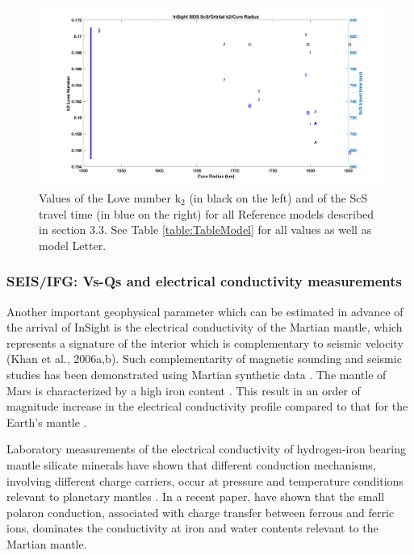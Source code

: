 \begin{figure}[h!]
\begin{center}
\includegraphics[width=1\textwidth]
{figures/FigureScS.png}
\caption{Values of the Love number k$_2$ (in black on the left) and of the ScS travel time (in blue on the right) for all Reference models described in section 3.3. See Table \ref{table:TableModel} for all values as well as model Letter.}
\label{fig:FigureScS.png} 
\end{center}
\end{figure}

\subsubsection{SEIS/IFG: Vs-Qs and electrical conductivity measurements}

Another important geophysical parameter which can be estimated in advance of the arrival of InSight is the electrical conductivity of the Martian mantle, which represents a signature of the interior which is complementary to seismic velocity (Khan et al., 2006a,b). Such complementarity of magnetic sounding and seismic studies has been demonstrated using Martian synthetic data \citep{Mocquet&Menvielle2000, Verhoeven2005}. The mantle of Mars is characterized by a high iron content \citep{McSween1994}. This result in an order of magnitude increase in the electrical conductivity profile compared to that for the Earth's mantle \citep{Vacher&Verhoeven2007}.

Laboratory measurements of the electrical conductivity of hydrogen-iron bearing mantle silicate minerals have shown that different conduction mechanisms, involving different charge carriers, occur at pressure and temperature conditions relevant to planetary mantles \citep[see e.g. the reviews of][]{Yoshino2010, Karato2011}. In a recent paper, \cite{Verhoeven&Vacher2016} have shown that the small polaron conduction, associated with charge transfer between ferrous and ferric ions, dominates the conductivity at iron and water contents relevant to the Martian mantle.


